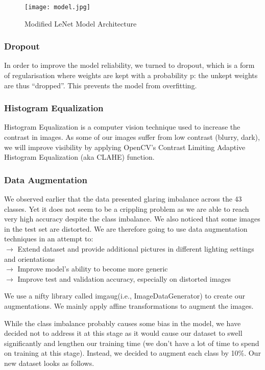 \begin{figure}[H]
	\centering
	\texttt{[image: model.jpg]}
	\caption{Modified LeNet Model Architecture}
\end{figure}


\subsubsection{Dropout}
In order to improve the model reliability, we turned to dropout, which is a form of regularisation where weights are kept with a probability p: the unkept weights are thus “dropped”. This prevents the model from overfitting.

\subsubsection{Histogram Equalization}
Histogram Equalization is a computer vision technique used to increase the contrast in images. As some of our images suffer from low contrast (blurry, dark), we will improve visibility by applying OpenCV’s Contrast Limiting Adaptive Histogram Equalization (aka CLAHE) function.

\subsubsection{Data Augmentation}
We observed earlier that the data presented glaring imbalance across the 43 classes. Yet it does not seem to be a crippling problem as we are able to reach very high accuracy despite the class imbalance. We also noticed that some images in the test set are distorted. We are therefore going to use data augmentation techniques in an attempt to:\\
$\to$ Extend dataset and provide additional pictures in different lighting settings and orientations\\
$\to$ Improve model’s ability to become more generic\\
$\to$ Improve test and validation accuracy, especially on distorted images

We use a nifty library called imgaug(i.e., ImageDataGenerator) to create our augmentations. We mainly apply affine transformations to augment the images.

While the class imbalance probably causes some bias in the model, we have decided not to address it at this stage as it would cause our dataset to swell significantly and lengthen our training time (we don’t have a lot of time to spend on training at this stage). Instead, we decided to augment each class by 10\%. Our new dataset looks as follows.

